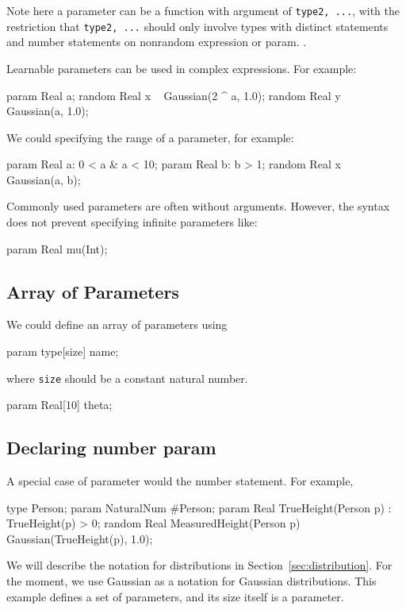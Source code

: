 \documentclass[12pt]{article}
\begin{document}
Note here a parameter can be a function with argument of \texttt{type2, ...}, with the restriction that \texttt{type2, ...} should only involve types with distinct statements and number statements on nonrandom expression or param.
. 

Learnable parameters can be used in complex expressions. For example:
\begin{blogcode}
param Real a;
random Real x ~ Gaussian(2 ^ a, 1.0);
random Real y ~ Gaussian(a, 1.0);
\end{blogcode}

We could specifying the range of a parameter, for example:
\begin{blogcode}
param Real a: 0 < a & a < 10;
param Real b: b > 1;
random Real x ~ Gaussian(a, b);
\end{blogcode}

Commonly used parameters are often without arguments. However, the syntax does not prevent specifying infinite parameters like:
\begin{blogcode}
param Real mu(Int);
\end{blogcode}

\subsection {Array of Parameters}
We could define an array of parameters using
\begin{blogcode}
param type[size] name;
\end{blogcode}
where {\tt size} should be a constant natural number.

\begin{blogcode}
param Real[10] theta;
\end{blogcode}

\subsection{Declaring number param}
A special case of parameter would the number statement. For example,
\begin{blogcode}
type Person;
param NaturalNum #Person;
param Real TrueHeight(Person p) : TrueHeight(p) > 0;
random Real MeasuredHeight(Person p) ~ Gaussian(TrueHeight(p), 1.0);
\end{blogcode}
We will describe the notation for distributions in Section~\ref{sec:distribution}. For the moment, we use Gaussian as a notation for Gaussian distributions.
This example defines a set of parameters, and its size itself is a parameter.
\end{document}
